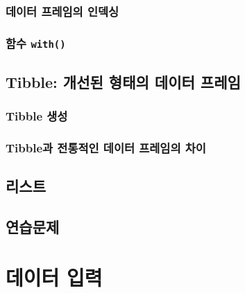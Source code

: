\documentclass[
]{book}
\begin{document}
\hypertarget{uxb370uxc774uxd130-uxd504uxb808uxc784uxc758-uxc778uxb371uxc2f1}{%
\subsection{데이터 프레임의 인덱싱}\label{uxb370uxc774uxd130-uxd504uxb808uxc784uxc758-uxc778uxb371uxc2f1}}

\hypertarget{uxd568uxc218-with}{%
\subsection{\texorpdfstring{함수 \texttt{with()}}{함수 with()}}\label{uxd568uxc218-with}}

\hypertarget{tibble-uxac1cuxc120uxb41c-uxd615uxd0dcuxc758-uxb370uxc774uxd130-uxd504uxb808uxc784}{%
\section{Tibble: 개선된 형태의 데이터 프레임}\label{tibble-uxac1cuxc120uxb41c-uxd615uxd0dcuxc758-uxb370uxc774uxd130-uxd504uxb808uxc784}}

\hypertarget{tibble-uxc0dduxc131}{%
\subsection{Tibble 생성}\label{tibble-uxc0dduxc131}}

\hypertarget{tibbleuxacfc-uxc804uxd1b5uxc801uxc778-uxb370uxc774uxd130-uxd504uxb808uxc784uxc758-uxcc28uxc774}{%
\subsection{Tibble과 전통적인 데이터 프레임의 차이}\label{tibbleuxacfc-uxc804uxd1b5uxc801uxc778-uxb370uxc774uxd130-uxd504uxb808uxc784uxc758-uxcc28uxc774}}

\hypertarget{section-list}{%
\section{리스트}\label{section-list}}

\hypertarget{uxc5f0uxc2b5uxbb38uxc81c}{%
\section{연습문제}\label{uxc5f0uxc2b5uxbb38uxc81c}}

\hypertarget{uxb370uxc774uxd130-uxc785uxb825}{%
\chapter{데이터 입력}\label{uxb370uxc774uxd130-uxc785uxb825}}
\end{document}

